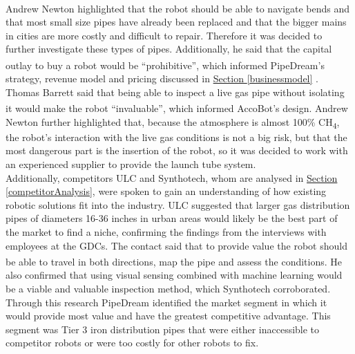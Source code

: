 \documentclass[11pt]{article}		%
\newcommand{\supercite}[1]{\textsuperscript{\cite{#1}}}		%
\newcommand{\sectref}[1]{\hyperref[#1]{Section \ref*{#1}}}     %
\begin{document}
	        \\
            \hspace*{2ex}Andrew Newton highlighted that the robot should be able to navigate bends and that most small size pipes have already been replaced and that the bigger mains in cities are more costly and difficult to repair. Therefore it was decided to further investigate these types of pipes. Additionally, he said that the capital outlay to buy a robot would be “prohibitive”\supercite{Newton}, which informed PipeDream's strategy, revenue model and pricing discussed in \sectref{businessmodel} .%
	        \\
            \hspace*{2ex}Thomas Barrett said that being able to inspect a live gas pipe without isolating it would make the robot “invaluable”\supercite{Barret}, which informed AccoBot's design. Andrew Newton further highlighted that, because the atmosphere is almost 100\% CH\textsubscript{4}, the robot’s interaction with the live gas conditions is not a big risk, but that the most dangerous part is the insertion of the robot, so it was decided to work with an experienced supplier to provide the launch tube system.
	        \\
            \hspace*{2ex}Additionally, competitors ULC and Synthotech, whom are analysed in \sectref{competitorAnalysis}, were spoken to gain an understanding of how existing robotic solutions fit into the industry. ULC suggested that larger gas distribution pipes of diameters 16-36 inches in urban areas would likely be the best part of the market to find a niche, confirming the findings from the interviews with employees at the GDCs. The contact said that to provide value the robot should be able to travel in both directions, map the pipe and assess the conditions\supercite{ULC_interview}. He also confirmed that using visual sensing combined with machine learning would be a viable and valuable inspection method, which Synthotech corroborated. %
	        \\  \hspace*{2ex}
           Through this research PipeDream identified the market segment in which it would provide most value and have the greatest competitive advantage. This segment was Tier 3 iron distribution pipes that were either inaccessible to competitor robots or were too costly for other robots to fix.
\end{document}
